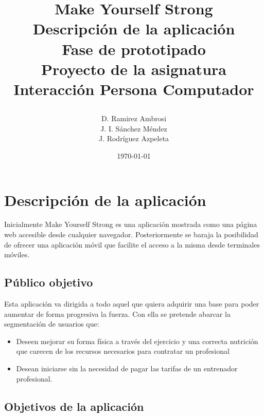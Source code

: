 \documentclass[a4paper]{article}
\date{}
\author{D. Ramirez Ambrosi \\ J. I. Sánchez Méndez \\ J. Rodríguez Azpeleta}
\title{\begin{center}
\textbf{\Huge{Make Yourself Strong}} \\ Descripción de la aplicación \\ Fase de prototipado \\Proyecto de la asignatura Interacción Persona Computador
\end{center}}
\date{\today}
\renewcommand\listfigurename{\centering LISTA DE FIGURAS}
\begin{document}
\maketitle

\thispagestyle{empty}%
\newpage
\tableofcontents%
\thispagestyle{empty}
\newpage





\setcounter{page}{1}%

\section{Descripción de la aplicación}

Inicialmente Make Yourself Strong es una aplicación mostrada como una página web accesible desde cualquier navegador. Posteriormente se baraja la posibilidad de ofrecer una aplicación móvil que facilite el acceso a la misma desde terminales móviles.

\subsection{Público objetivo}
Esta aplicación va dirigida a todo aquel que quiera adquirir una base para poder aumentar de forma progresiva la fuerza. Con ella se pretende abarcar la segmentación de usuarios que:

\begin{itemize}
	\item	Deseen mejorar su forma física a través del ejercicio y una correcta nutrición que carecen de los recursos necesarios para contratar un profesional
	\item	Desean iniciarse sin la necesidad de pagar las tarifas de un entrenador profesional.
\end{itemize}


\subsection{Objetivos de la aplicación}
\end{document}
